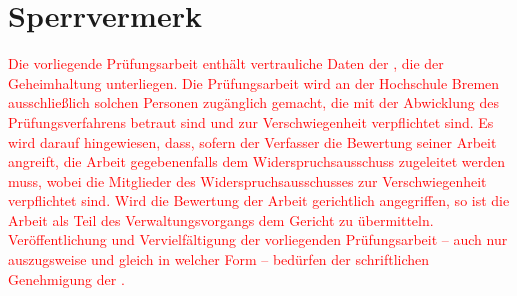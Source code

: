 \section*{Sperrvermerk}
\textcolor{red}{
Die vorliegende Prüfungsarbeit enthält vertrauliche Daten der \domain, die der Geheimhaltung 
unterliegen. Die Prüfungsarbeit wird an der Hochschule Bremen ausschließlich solchen 
Personen zugänglich gemacht, die mit der Abwicklung des Prüfungsverfahrens betraut sind und 
zur Verschwiegenheit verpflichtet sind. Es wird darauf hingewiesen, dass, sofern der 
Verfasser die Bewertung seiner Arbeit angreift, die Arbeit gegebenenfalls dem 
Widerspruchsausschuss zugeleitet werden muss, wobei die Mitglieder des Widerspruchsausschusses zur Verschwiegenheit verpflichtet sind. Wird die Bewertung der Arbeit 
gerichtlich angegriffen, so ist die Arbeit als Teil des Verwaltungsvorgangs dem Gericht zu 
übermitteln. Veröffentlichung und Vervielfältigung der vorliegenden Prüfungsarbeit – auch 
nur auszugsweise und gleich in welcher Form – bedürfen der schriftlichen Genehmigung der \domain.
}